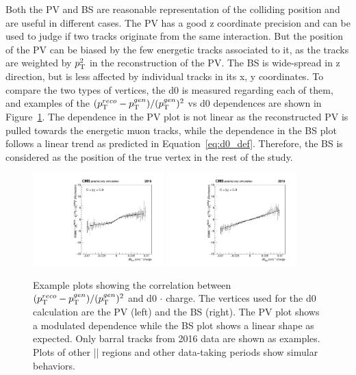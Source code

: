 Both the PV and BS are reasonable representation of the colliding position and are useful in different cases.
The PV has a good z coordinate precision and can be used to judge if two tracks originate from the same interaction. 
But the position of the PV can be biased by the few energetic tracks associated to it, 
as the tracks are weighted by $p_{\mathrm{T}}^{2}$ in the reconstruction of the PV.
The BS is wide-spread in z direction, but is less affected by individual tracks in its x, y coordinates.
To compare the two types of vertices, the d0 is measured regarding each of them, 
and examples of the $(p_{\mathrm{T}}^{reco}-p_{\mathrm{T}}^{gen})/ (p_{\mathrm{T}}^{gen})^{2}$ vs d0 dependences are shown in Figure~\ref{fig:pv_vs_bs_fits}.
The dependence in the PV plot is not linear as the reconstructed PV is pulled towards the energetic muon tracks,
while the dependence in the BS plot follows a linear trend as predicted in Equation~\ref{eq:d0_def}.
Therefore, the BS is considered as the position of the true vertex in the rest of the study.

\begin{figure}[!htb]
      \centering
      \captionsetup{justification=justified}
      \includegraphics[width=0.45\textwidth]{pics/muon_corr/GeoFit/fit_results/d0_pt_PV_eg.pdf}
      \includegraphics[width=0.45\textwidth]{pics/muon_corr/GeoFit/fit_results/d0_pt_BS_eg.pdf}
      \caption{Example plots showing the correlation between $(p_{\mathrm{T}}^{reco}-p_{\mathrm{T}}^{gen})/ (p_{\mathrm{T}}^{gen})^{2}$ and d0 $\cdot$ charge.
               The vertices used for the d0 calculation are the PV (left) and the BS (right). 
               The PV plot shows a modulated dependence while the BS plot shows a linear shape as expected.
               Only barral tracks from 2016 data are shown as examples. 
               Plots of other |\eta| regions and other data-taking periods show simular behaviors.
               }
      \label{fig:pv_vs_bs_fits}
\end{figure}

